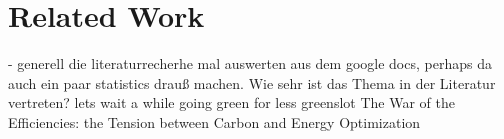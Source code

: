 \chapter{Related Work}

- generell die literaturrecherhe mal auswerten aus dem google docs, perhaps da auch ein paar statistics drauß machen. Wie sehr ist das Thema in der Literatur vertreten? 
lets wait a while
going green for less
greenslot
The War of the Efficiencies: the Tension between Carbon and Energy Optimization